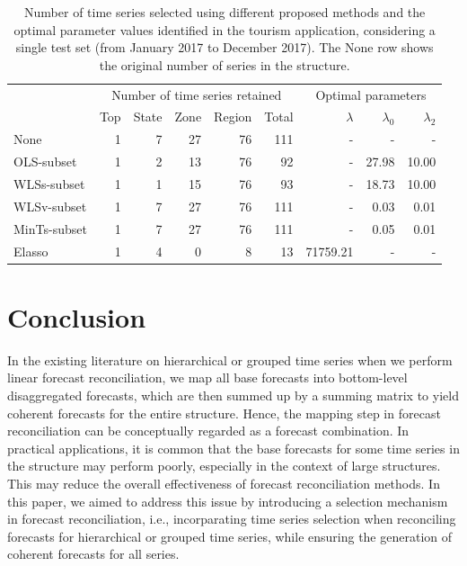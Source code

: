 \documentclass[
  12pt,
  11pt]{article}
\begin{document}
\hypertarget{tbl-tourism-info}{}
\begin{table}[!h]
\caption{\label{tbl-tourism-info}Number of time series selected using different proposed methods and the
optimal parameter values identified in the tourism application,
considering a single test set (from January 2017 to December 2017). The
None row shows the original number of series in the structure. }\tabularnewline

\centering\begingroup\fontsize{10}{12}\selectfont

\begin{tabular}{lrrrrrrrr}
\toprule
\multicolumn{1}{c}{} & \multicolumn{5}{c}{Number of time series retained} & \multicolumn{3}{c}{Optimal parameters} \\
\cmidrule(l{3pt}r{3pt}){2-6} \cmidrule(l{3pt}r{3pt}){7-9}
  & Top & State & Zone & Region & Total & $\lambda$ & $\lambda_0$ & $\lambda_2$\\
\midrule
None & 1 & 7 & 27 & 76 & 111 & - & - & -\\
OLS-subset & 1 & 2 & 13 & 76 & 92 & - & 27.98 & 10.00\\
WLSs-subset & 1 & 1 & 15 & 76 & 93 & - & 18.73 & 10.00\\
WLSv-subset & 1 & 7 & 27 & 76 & 111 & - & 0.03 & 0.01\\
MinTs-subset & 1 & 7 & 27 & 76 & 111 & - & 0.05 & 0.01\\
Elasso & 1 & 4 & 0 & 8 & 13 & 71759.21 & - & -\\
\bottomrule
\end{tabular}
\endgroup{}
\end{table}

\hypertarget{sec-conclusion}{%
\section{Conclusion}\label{sec-conclusion}}

In the existing literature on hierarchical or grouped time series when
we perform linear forecast reconciliation, we map all base forecasts
into bottom-level disaggregated forecasts, which are then summed up by a
summing matrix to yield coherent forecasts for the entire structure.
Hence, the mapping step in forecast reconciliation can be conceptually
regarded as a forecast combination. In practical applications, it is
common that the base forecasts for some time series in the structure may
perform poorly, especially in the context of large structures. This may
reduce the overall effectiveness of forecast reconciliation methods. In
this paper, we aimed to address this issue by introducing a selection
mechanism in forecast reconciliation, i.e., incorparating time series
selection when reconciling forecasts for hierarchical or grouped time
series, while ensuring the generation of coherent forecasts for all
series.
\end{document}
